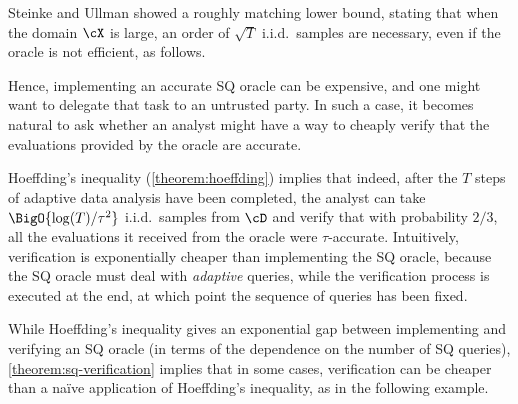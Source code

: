 \documentclass{toc}
\begin{document}
Steinke and Ullman \cite{DBLP:conf/colt/SteinkeU15} showed a roughly matching lower bound, stating that when the domain $\cX$ is large, an order of $\sqrt{T}$ i.i.d.\ samples are necessary, even if the oracle is not efficient, as follows.


Hence, implementing an accurate SQ oracle can be expensive, and one might want to delegate that task to an untrusted party. In such a case, it becomes natural to ask whether an analyst might have a way to cheaply verify that the evaluations provided by the oracle are accurate. 

Hoeffding's inequality (\cref{theorem:hoeffding}) implies that indeed, after the $T$ steps of adaptive data analysis have been completed, the analyst can take $\BigO{\log(T)/\tau^2}$ i.i.d.\ samples from $\cD$ and verify that with probability $2/3$, all the evaluations it received from the oracle were $\tau$-accurate. Intuitively, verification is exponentially cheaper than implementing the SQ oracle, because the SQ oracle must deal with \emph{adaptive} queries, while the verification process is executed at the end, at which point the sequence of queries has been fixed.

While Hoeffding's inequality gives an exponential gap between implementing and verifying an SQ oracle (in terms of the dependence on the number of SQ queries), \cref{theorem:sq-verification} implies that in some cases, verification can be cheaper than a na\"ive application of Hoeffding's inequality, as in the following example.
\end{document}

